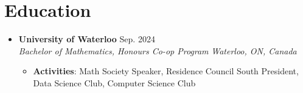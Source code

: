 \documentclass[letterpaper,11pt]{article}
\newcommand{\resumeItem}[1]{\item\small{#1\vspace{-2pt}}}
\newcommand{\resumeSubheading}[4]{
  \vspace{-1pt}\item
    {\textbf{#1} \hfill #2}\\
    {\textit{#3} \hfill \textit{#4}}\vspace{-8pt}
}
\newcommand{\resumeSubHeadingListStart}{\begin{itemize}[leftmargin=0.15in, label={}]}
\newcommand{\resumeSubHeadingListEnd}{\end{itemize}}
\newcommand{\resumeItemListStart}{\begin{itemize}[leftmargin=0.15in]}
\newcommand{\resumeItemListEnd}{\end{itemize}\vspace{-5pt}}
\begin{document}
\section*{\color{headings}Education}
  \resumeSubHeadingListStart
    \resumeSubheading
      {University of Waterloo}{Sep. 2024}
      {Bachelor of Mathematics, Honours Co-op Program}{Waterloo, ON, Canada}
      \resumeItemListStart
        \resumeItem{\textbf{Activities}: Math Society Speaker, Residence Council South President, Data Science Club, Computer Science Club}
      \resumeItemListEnd
  \resumeSubHeadingListEnd

\end{document}
